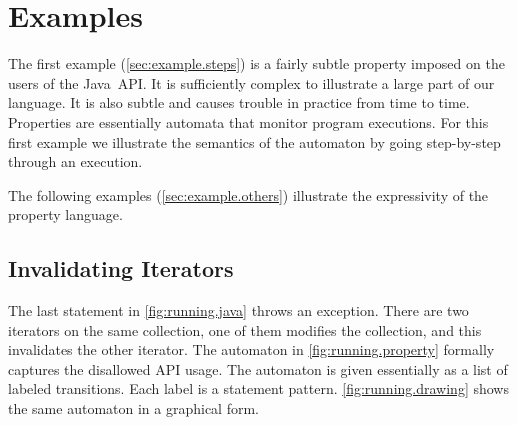 \documentclass[preprint]{sigplanconf} %
\theoremstyle{definition}
\begin{document}
\section{Examples} \label{sec:example} %

The first example (\autoref{sec:example.steps}) is a fairly subtle property imposed on the users of the Java~API\null.
It is sufficiently complex to illustrate a large part of our language.
It is also subtle and causes trouble in practice from time to time.
Properties are essentially automata that monitor program executions.
For this first example we illustrate the semantics of the automaton by going step-by-step through an execution.

The following examples (\autoref{sec:example.others}) illustrate the expressivity of the property language.

\subsection{Invalidating Iterators} \label{sec:example.steps} %

The last statement in \autoref{fig:running.java} throws an exception.
There are two iterators on the same collection, one of them modifies the collection, and this invalidates the other iterator.
The automaton in \autoref{fig:running.property} formally captures the disallowed API usage.
The automaton is given essentially as a list of labeled transitions.
Each label is a statement pattern.
\autoref{fig:running.drawing} shows the same automaton in a graphical form.
\end{document}
